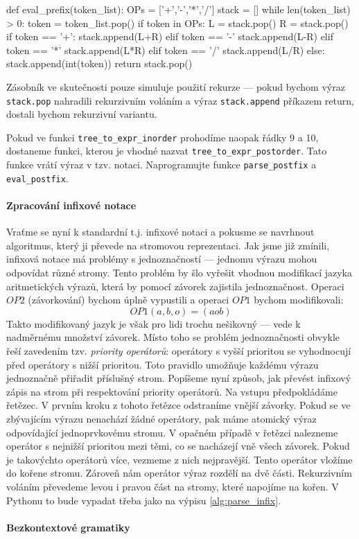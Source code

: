 \begin{python}
def eval_prefix(token_list):
    OPs = ['+','-','*','/']
    stack = []
    while len(token_list) > 0:
        token = token_list.pop()
        if token in OPs:
          L = stack.pop()
          R = stack.pop()
          if token == '+':
            stack.append(L+R)
          elif token == '-'
            stack.append(L-R)
          elif token == '*'
            stack.append(L*R)
          elif token == '/'
            stack.append(L/R)
        else:
          stack.append(int(token))
    return stack.pop()
\end{python}

Zásobník ve skutečnosti pouze simuluje použití rekurze --- pokud bychom 
výraz {\tt stack.pop} nahradili rekurzivním voláním a výraz {\tt stack.append}
příkazem return, dostali bychom rekurzivní variantu.

\begin{cviceni} Pokud ve funkci {\tt tree\_to\_expr\_inorder} prohodíme naopak
řádky 9 a 10, dostaneme funkci, kterou je vhodné nazvat 
{\tt tree\_to\_expr\_postorder}. Tato funkce vrátí výraz v tzv. 
notaci. Naprogramujte funkce {\tt parse\_postfix} a {\tt eval\_postfix}.
\end{cviceni}

\paragraph{Zpracování infixové notace}
Vraťme se nyní k standardní t.j. infixové notaci a pokusme se navrhnout
algoritmus, který ji převede na stromovou reprezentaci. Jak jsme již zmínili,
infixová notace má problémy s jednoznačností --- jednomu výrazu mohou odpovídat
různé stromy. Tento problém by šlo vyřešit vhodnou modifikací jazyka aritmetických
výrazů, která by pomocí závorek zajistila jednoznačnost. Operaci \(OP2\) (závorkování)
bychom úplně vypustili a operaci \(OP1\) bychom modifikovali:
\[
 OP1(a,b,o) = (aob)
\]
Takto modifikovaný jazyk je však pro lidi trochu nešikovný --- vede k nadměrnému
množství závorek. Místo toho se problém jednoznačnosti obvykle řeší zavedením
tzv. \emph{priority operátorů}: operátory s vyšší prioritou se vyhodnocují před
operátory s nižší prioritou. Toto pravidlo umožňuje každému výrazu jednoznačně
přiřadit příslušný strom. Popíšeme nyní způsob, jak převést infixový zápis
na strom při respektování priority operátorů. Na vstupu předpokládáme řetězec.
V prvním kroku z tohoto řetězce odstraníme vnější závorky. Pokud se ve zbývajícím
výrazu nenachází žádné operátory, pak máme atomický výraz odpovídající jednoprvkovému
stromu. V opačném případě v řetězci nalezneme operátor s nejnižší prioritou mezi 
těmi, co se nacházejí vně všech závorek. Pokud je takovýchto operátorů více, 
vezmeme z nich nejpravější. Tento operátor vložíme do kořene stromu. Zároveň
nám operátor výraz rozdělí na dvě části. Rekurzivním voláním převedeme levou i
pravou část na stromy, které napojíme na kořen. V Pythonu to bude vypadat
třeba jako na výpisu \ref{alg:parse_infix}.



\paragraph{Bezkontextové gramatiky}

\ifx\ucebnice\undefined

\fi
